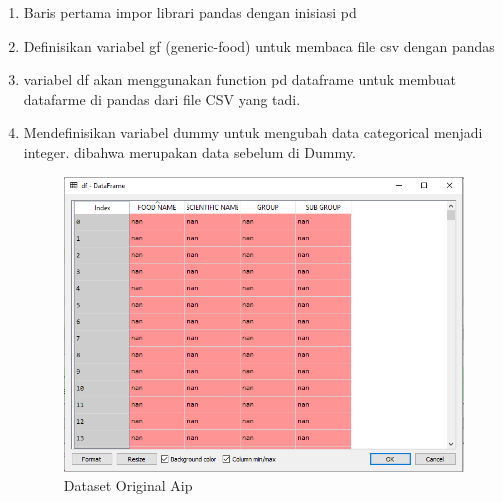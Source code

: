 \begin{enumerate}
\item Baris pertama impor librari pandas dengan inisiasi pd
\item Definisikan variabel gf (generic-food) untuk membaca file csv dengan pandas
\item variabel df akan menggunakan function pd dataframe untuk membuat datafarme di pandas dari file CSV yang tadi.
\item Mendefinisikan variabel dummy untuk mengubah data categorical menjadi integer. dibahwa merupakan data sebelum di Dummy. 
\begin{figure}[ht]
\centering
\includegraphics[scale=0.5]{figures/AIP/c2.PNG}
\caption{Dataset Original Aip}
\label{Aplikasi Pandas}
\end{figure}


\end{enumerate}
